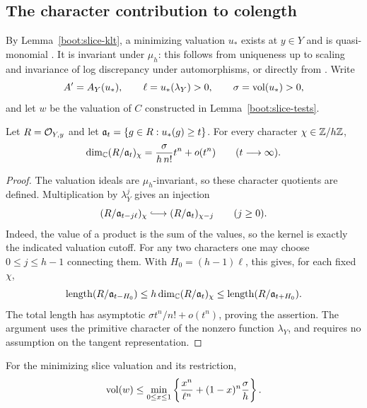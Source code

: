 \subsection{The character contribution to colength}

By Lemma~\ref{boot:slice-klt}, a minimizing valuation $u_*$
exists at $y\in Y$ and is quasi-monomial
\cite[Theorem~1.2(1)]{XZStable}.  It is invariant under
$\mu_h$: this follows from uniqueness up to scaling and
invariance of log discrepancy under automorphisms, or directly
from \cite[Theorem~1.1 and Corollary~1.2]{XZ21}.  Write
\[
 A'=A_Y(u_*),\qquad
 \ell=u_*(\lambda_Y)>0,\qquad
 \sigma=\operatorname{vol}(u_*)>0,
\]
and let $w$ be the valuation of $C$ constructed in
Lemma~\ref{boot:slice-tests}.

\begin{lemma}
\label{boot:character-shares}
Let $R=\mathcal O_{Y,y}$ and let $\mathfrak a_t=\{g\in R:u_*(g)\geq t\}$.
For every character $\chi\in\mathbb Z/h\mathbb Z$,
\[
 \dim_\mathbb C(R/\mathfrak a_t)_\chi
 =\frac{\sigma}{h\,n!}t^n+o(t^n)
 \qquad(t\longrightarrow\infty).
\]
\end{lemma}

\begin{proof}
The valuation ideals are $\mu_h$-invariant, so these character
quotients are defined.  Multiplication by $\lambda_Y^j$ gives
an injection
\[
 (R/\fa_{t-j\ell})_\chi
 \lhook\joinrel\longrightarrow
 (R/\fa_t)_{\chi-j}
 \qquad(j\geq0).
\]
Indeed, the value of a product is the sum of the values, so
the kernel is exactly the indicated valuation cutoff.  For
any two characters one may choose $0\leq j\leq h-1$ connecting
them.  With $H_0=(h-1)\ell$, this gives, for each fixed
$\chi$,
\[
 \operatorname{length}(R/\mathfrak a_{t-H_0})
 \leq h\dim_\mathbb C(R/\mathfrak a_t)_\chi
 \leq \operatorname{length}(R/\mathfrak a_{t+H_0}).
\]
The total length has asymptotic
$\sigma t^n/n!+o(t^n)$, proving the assertion.  The argument
uses the primitive character of the nonzero function
$\lambda_Y$, and requires no assumption on the tangent
representation.
\end{proof}

\begin{proposition}
\label{boot:refined-estimate}
For the minimizing slice valuation and its restriction,
\begin{equation}
 \label{boot:refined-volume}
 \operatorname{vol}(w)\leq
 \min_{0\leq x\leq1}
 \left\{\frac{x^n}{\ell^n}
                 +(1-x)^n\frac{\sigma}{h}\right\}.
\end{equation}
\end{proposition}

